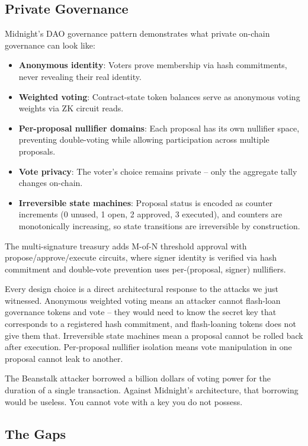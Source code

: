 \documentclass[
  11pt,
  openany]{report}
\providecommand{\tightlist}{%
  \setlength{\itemsep}{0pt}\setlength{\parskip}{0pt}}
\renewcommand{\textbf}[1]{{\bfseries\color{MidnightBold}#1}}
\begin{document}
\subsection{Private Governance}\label{private-governance}

Midnight's DAO governance pattern demonstrates what private on-chain governance
can look like:

\begin{itemize}
\tightlist
\item
  \textbf{Anonymous identity}: Voters prove membership via hash commitments,
  never revealing their real identity.
\item
  \textbf{Weighted voting}: Contract-state token balances serve as anonymous
  voting weights via ZK circuit reads.
\item
  \textbf{Per-proposal nullifier domains}: Each proposal has its own nullifier
  space, preventing double-voting while allowing participation across multiple
  proposals.
\item
  \textbf{Vote privacy}: The voter's choice remains private -- only the
  aggregate tally changes on-chain.
\item
  \textbf{Irreversible state machines}: Proposal status is encoded as counter
  increments (0 unused, 1 open, 2 approved, 3 executed), and counters are
  monotonically increasing, so state transitions are irreversible by
  construction.
\end{itemize}

The multi-signature treasury adds M-of-N threshold approval with
propose/approve/execute circuits, where signer identity is verified via hash
commitment and double-vote prevention uses per-(proposal, signer) nullifiers.

Every design choice is a direct architectural response to the attacks we just
witnessed. Anonymous weighted voting means an attacker cannot flash-loan
governance tokens and vote -- they would need to know the secret key that
corresponds to a registered hash commitment, and flash-loaning tokens does not
give them that. Irreversible state machines mean a proposal cannot be rolled
back after execution. Per-proposal nullifier isolation means vote manipulation
in one proposal cannot leak to another.

The Beanstalk attacker borrowed a billion dollars of voting power for the
duration of a single transaction. Against Midnight's architecture, that
borrowing would be useless. You cannot vote with a key you do not possess.

\subsection{The Gaps}\label{the-gaps}
\end{document}
